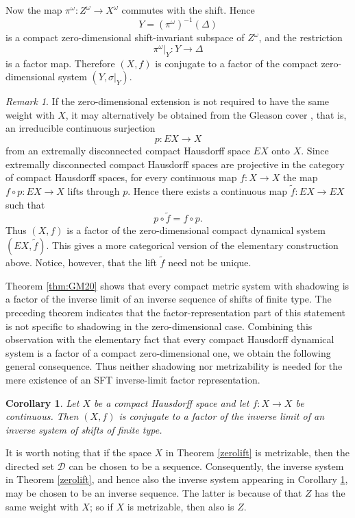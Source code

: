 \documentclass[12pt]{amsart}
\newtheorem{corollary}[theorem]{Corollary}
\theoremstyle{definition}
\numberwithin{equation}{section}
\theoremstyle{remark}
\newtheorem{remark}[theorem]{Remark}
\begin{document}
Now the map $\pi^\omega:Z^\omega\to X^\omega$ commutes with the shift. Hence
\[
    Y=(\pi^\omega)^{-1}(\Delta)
\]
is a compact zero-dimensional shift-invariant subspace of $Z^\omega$, and the
restriction
\[
    \pi^\omega|_Y:Y\to\Delta
\]
is a factor map. Therefore $(X,f)$ is conjugate to a factor of the compact
zero-dimensional system $(Y,\sigma|_Y)$.


\begin{remark}
If the zero-dimensional extension is not required to have the same weight with $X$, it may alternatively be obtained from the Gleason cover \cite{Gleason,Johnstone}, that is, an irreducible continuous surjection
\[
    p:EX\to X
\]
from an extremally disconnected compact Hausdorff space $EX$ onto $X$. Since extremally disconnected compact Hausdorff spaces are
projective in the category of compact Hausdorff spaces, for every continuous map
$f:X\to X$ the map $f\circ p:EX\to X$ lifts through $p$. Hence there exists a
continuous map $\widetilde f:EX\to EX$ such that
\[
    p\circ \widetilde f=f\circ p.
\]
Thus $(X,f)$ is a factor of the zero-dimensional compact dynamical system
$(EX,\widetilde f)$. This gives a more categorical version of the elementary
construction above. Notice, however, that the lift $\widetilde f$ need not be
unique.
\end{remark}


Theorem \ref{thm:GM20} shows that every compact metric system with shadowing is
a factor of the inverse limit of an inverse sequence of shifts of finite type.
The preceding theorem indicates that the factor-representation part of this
statement is not specific to shadowing in the zero-dimensional case. Combining
this observation with the elementary fact that every compact Hausdorff
dynamical system is a factor of a compact zero-dimensional one, we obtain the
following general consequence. Thus neither shadowing nor metrizability is
needed for the mere existence of an SFT inverse-limit factor representation.


\begin{corollary}\label{coro:fac}
Let $X$ be a compact Hausdorff space and let $f:X\to X$ be continuous. Then
$(X,f)$ is conjugate to a factor of the inverse limit of an inverse system of
shifts of finite type.
\end{corollary}

It is worth noting that if the space $X$ in Theorem \ref{zerolift} is metrizable, then the directed set
$\mathcal D$ can be chosen to be a sequence.
Consequently, the inverse system in Theorem \ref{zerolift}, and hence also the
inverse system appearing in Corollary \ref{coro:fac}, may be chosen to be an
inverse sequence. The latter is because of that $Z$ has the same weight with $X$; so if $X$ is metrizable, then also is $Z$.
\end{document}
